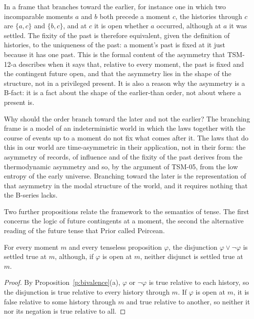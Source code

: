 \documentclass{situationist-preprint}
\begin{document}
In a frame that branches toward the earlier, for instance one in which two incomparable moments $a$ and $b$ both precede a moment $c$, the histories through $c$ are $\{a, c\}$ and $\{b, c\}$, and at $c$ it is open whether $a$ occurred, although at $a$ it was settled. The fixity of the past is therefore equivalent, given the definition of histories, to the uniqueness of the past: a moment's past is fixed at it just because it has one past. This is the formal content of the asymmetry that TSM-12-a describes when it says that, relative to every moment, the past is fixed and the contingent future open, and that the asymmetry lies in the shape of the structure, not in a privileged present. It is also a reason why the asymmetry is a B-fact: it is a fact about the shape of the earlier-than order, not about where a present is.

Why should the order branch toward the later and not the earlier? The branching frame is a model of an indeterministic world in which the laws together with the course of events up to a moment do not fix what comes after it. The laws that do this in our world are time-asymmetric in their application, not in their form: the asymmetry of records, of influence and of the fixity of the past derives from the thermodynamic asymmetry and so, by the argument of TSM-05, from the low entropy of the early universe. Branching toward the later is the representation of that asymmetry in the modal structure of the world, and it requires nothing that the B-series lacks.

Two further propositions relate the framework to the semantics of tense. The first concerns the logic of future contingents at a moment, the second the alternative reading of the future tense that Prior called Peircean.

\begin{proposition}\label{p:superval}
For every moment $m$ and every tenseless proposition $\varphi$, the disjunction $\varphi \lor \neg\varphi$ is settled true at $m$, although, if $\varphi$ is open at $m$, neither disjunct is settled true at $m$.
\end{proposition}

\begin{proof}
By Proposition~\ref{p:bivalence}(a), $\varphi$ or $\neg\varphi$ is true relative to each history, so the disjunction is true relative to every history through $m$. If $\varphi$ is open at $m$, it is false relative to some history through $m$ and true relative to another, so neither it nor its negation is true relative to all.
\end{proof}
\end{document}

